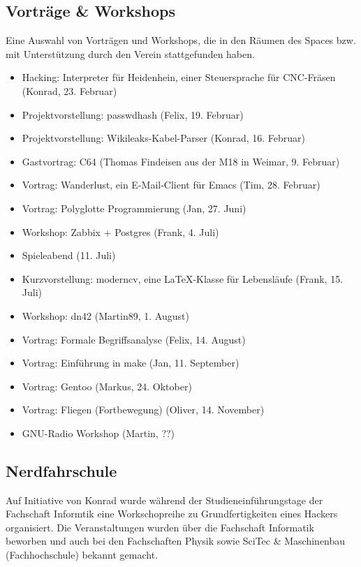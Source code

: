 \documentclass[10pt,DIV16]{scrartcl}
\begin{document}
\subsection{Vorträge \& Workshops}

Eine Auswahl von Vorträgen und Workshops, die in den Räumen des 
Spaces bzw. mit Unterstützung durch den Verein stattgefunden haben. 

\begin{itemize}
	\item Hacking:  Interpreter für Heidenhein, einer Steuersprache für CNC-Fräsen (Konrad, 23. Februar)
	\item Projektvorstellung:  passwdhash (Felix, 19. Februar)
	\item Projektvorstellung:  Wikileaks-Kabel-Parser (Konrad, 16. Februar)
	\item Gastvortrag:  C64 (Thomas Findeisen aus der M18 in Weimar, 9. Februar)
	\item Vortrag:  Wanderlust, ein E-Mail-Client für Emacs (Tim, 28. Februar)
	\item Vortrag: Polyglotte Programmierung  (Jan, 27. Juni)
	\item Workshop:  Zabbix + Postgres (Frank, 4. Juli)
	\item Spieleabend (11. Juli)
	\item Kurzvorstellung: moderncv, eine \LaTeX-Klasse für Lebensläufe (Frank, 15. Juli)
	\item Workshop:  dn42 (Martin89, 1. August)
	\item Vortrag:  Formale Begriffsanalyse (Felix, 14. August)
	\item Vortrag:  Einführung in make (Jan, 11. September)
	\item Vortrag:  Gentoo (Markus, 24. Oktober)
	\item Vortrag:  Fliegen (Fortbewegung) (Oliver, 14. November)
	\item GNU-Radio Workshop (Martin, ??)
\end{itemize}

\subsection{Nerdfahrschule}

Auf Initiative von Konrad wurde während der Studieneinführungstage der
Fachschaft Informtik eine Workschopreihe zu Grundfertigkeiten eines Hackers
organisiert.  Die Veranstaltungen wurden über die Fachschaft Informatik
beworben und auch bei den Fachschaften Physik sowie SciTec \& Maschinenbau
(Fachhochschule) bekannt gemacht.
\end{document}
